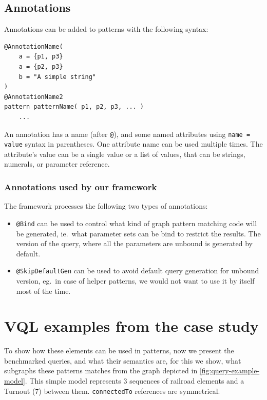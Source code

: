 \subsection{Annotations}

\begin{minipage}{\textwidth}
Annotations can be added to patterns with the following syntax:
\begin{lstlisting}[language=vql]
@AnnotationName(
	a = {p1, p3}
	a = {p2, p3}
	b = "A simple string"
)
@AnnotationName2
pattern patternName( p1, p2, p3, ... )
	...
\end{lstlisting}
\end{minipage}
\vspace{\belowdisplayskip}

An annotation has a name (after \texttt{@}), and some named attributes using \texttt{name = value} syntax in parentheses.
One attribute name can be used multiple times. 
The attribute's value can be a single value or a list of values, that can be strings, numerals, or parameter reference.


\subsubsection{Annotations used by our framework}

The framework processes the following two types of annotations:
\begin{itemize}
	\item \texttt{@Bind} can be used to control what kind of graph pattern matching code will be generated, ie.\ what parameter sets can be bind to restrict the results. The version of the query, where all the parameters are unbound is generated by default.
	
	\item \texttt{@SkipDefaultGen} can be used to avoid default query generation for unbound version, eg.\ in case of helper patterns, we would not want to use it by itself most of the time.
	
\end{itemize}


\section{VQL examples from the case study}
\label{sec:vql-examples}

To show how these elements can be used in patterns, now we present the benchmarked queries, and what their semantics are, for this we show, what subgraphs these patterns matches from the graph depicted in \autoref{fig:query-example-model}. This simple model represents 3 sequences of railroad elements and a Turnout (7) between them. \texttt{connectedTo} references are symmetrical.
\vspace{0.1\textwidth}


